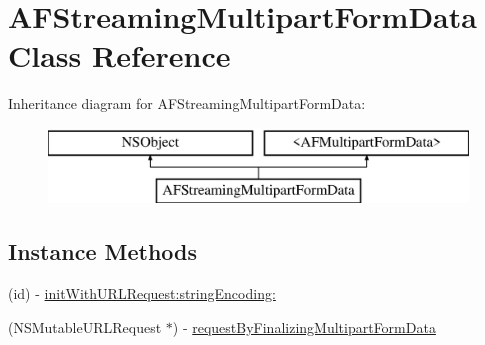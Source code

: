 \hypertarget{interface_a_f_streaming_multipart_form_data}{\section{A\-F\-Streaming\-Multipart\-Form\-Data Class Reference}
\label{interface_a_f_streaming_multipart_form_data}
}
Inheritance diagram for A\-F\-Streaming\-Multipart\-Form\-Data\-:\begin{figure}[H]
\begin{center}
\leavevmode
\includegraphics[height=2.000000cm]{interface_a_f_streaming_multipart_form_data}
\end{center}
\end{figure}
\subsection*{Instance Methods}
\begin{DoxyCompactItemize}
\item 
(id) -\/ \hyperlink{interface_a_f_streaming_multipart_form_data_a2e2cf245d469c301bdcb052e5f0ef340}{init\-With\-U\-R\-L\-Request\-:string\-Encoding\-:}
\item 
(N\-S\-Mutable\-U\-R\-L\-Request $\ast$) -\/ \hyperlink{interface_a_f_streaming_multipart_form_data_abbd01865c8d7c04527345d34c08db293}{request\-By\-Finalizing\-Multipart\-Form\-Data}
\end{DoxyCompactItemize}



